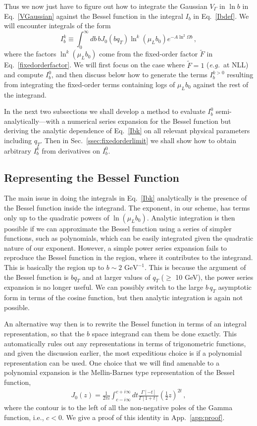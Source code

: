 \documentclass[a4,letterpaper,11pt]{article}
\newcommand{\be}{\begin{equation}}
\newcommand{\ee}{\end{equation}}
\newcommand{\bea}{\begin{eqnarray}}
\newcommand{\eea}{\end{eqnarray}}
\newcommand{\GeV}{\text{ GeV}}
\newcommand{\eg}{\emph{e.g.}~}
\newcommand{\wt}{\widetilde}
\newcommand{\eq}[1]{Eq.~\eqref{#1}}
\newcommand{\ssec}[1]{Sec.~\ref{ssec:#1}}
\newcommand{\appx}[1]{App.~\ref{app:#1}}
\begin{document}
Thus we now just have to figure out how to integrate the Gaussian $V_\Gamma$ in $\ln b$ in \eq{VGaussian} against the Bessel function in the integral $I_b$ in \eq{Ibdef}. We will encounter integrals of the form
\be
\label{Ibk}
I_b^k\equiv \int_0^\infty db\, b J_0(b q_T) \ln^k(\mu_L b_0) e^{-A \ln^2\Omega b}\,,
\ee
where the factors $\ln^k(\mu_L b_0)$ come from the fixed-order factor $\wt F$ in \eq{fixedorderfactor}. 
We will first focus on the case where $\wt F = 1$ (\eg at NLL) and compute $I_b^0$, and then discuss below how to generate the terms $I_b^{k>0}$ resulting from integrating the fixed-order terms containing logs of $\mu_L b_0$ against the rest of the integrand.

In the next two subsections we shall develop a method to evaluate $I_b^0$ semi-analytically---with a numerical series expansion for the Bessel function but deriving the analytic dependence of \eq{Ibk} on all relevant physical parameters including $q_T$. Then in \ssec{fixedorderlimit} we shall show how to obtain arbitrary $I_b^k$ from derivatives on $I_b^0$.



\subsection{Representing the Bessel Function}

The main issue in doing the integrals in \eq{Ibk} analytically is the presence of the Bessel function inside the integrand.
The exponent, in our scheme, has terms only up to the quadratic powers of $\ln(\mu_L b_0)$.  Analytic integration is then possible if we can approximate the Bessel function using a series of simpler functions, such as polynomials, which can be easily integrated given the quadratic nature of our exponent. However, a simple power series expansion fails to reproduce the Bessel function in the region, where it contributes to the integrand. This is basically the region up to $b \sim 2 \GeV^{-1}$.  This is because the argument of the Bessel function is  $b q_T$ and at larger values of $q_T$ ($\geq$ 10 GeV),
the power series expansion is no longer useful. We can possibly switch to the large $b\, q_T$ asymptotic form in terms of the cosine function, but then analytic integration is again not possible.


An alternative way then is to rewrite the Bessel function in terms of an integral representation, so that the $b$ space integrand can them be done exactly. This automatically rules out any representations in terms of trigonometric functions, and given the discussion earlier, the most expeditious choice is if a polynomial representation can be used. One choice that we will find amenable to a polynomial expansion is the Mellin-Barnes type representation of the Bessel function, 
\bea
\label{Mellin-Barnes}
J_0(z) = \frac{1}{2 \pi i}\int_{c-i \infty}^{c+i \infty} dt \frac{\Gamma[-t]}{\Gamma[1+t]} \left(\frac{1}{2} z \right)^{2t}  
\,,\eea
where the contour is to the left of all the non-negative poles of the Gamma function, i.e., $c<0$. We give a proof of this identity in \appx{proof}.
\end{document}

